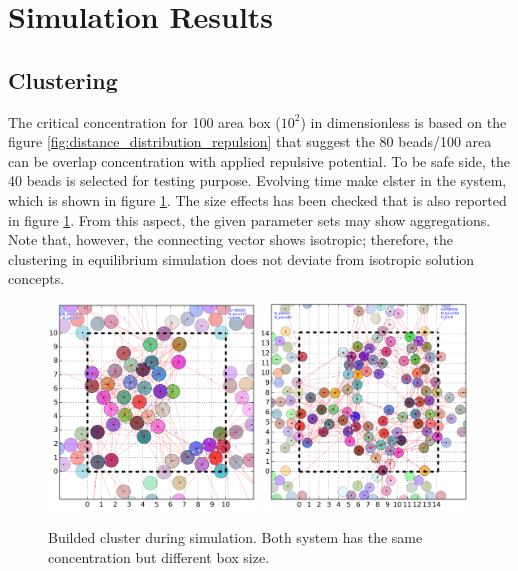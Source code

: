 \message{ !name(brief_Brownian_dynamics.tex)}\documentclass[10pt, a4paper]{report}
\begin{document}
\section{Simulation Results}
\subsection{Clustering}
The critical concentration for 100 area box ($10^2$) in dimensionless is based on the figure \ref{fig:distance_distribution_repulsion} that suggest the 80 beads/100 area can be overlap concentration with applied repulsive potential. To be safe side, the 40 beads is selected for testing purpose. Evolving time make clster in the system, which is shown in figure \ref{fig:clustering}. The size effects has been checked that is also reported in figure \ref{fig:clustering}. From this aspect, the given parameter sets may show aggregations. Note that, however, the connecting vector shows isotropic; therefore, the clustering in equilibrium simulation does not deviate from isotropic solution concepts. 

\begin{figure}
  \centering
  \includegraphics[width=0.49\textwidth]{figures/NP40_A100_clustering.png}
  \includegraphics[width=0.49\textwidth]{figures/NP80_A200_clustering.png}
  \caption{Builded cluster during simulation. Both system has the same concentration but different box size.}
  \label{fig:clustering}
\end{figure}
\end{document}
